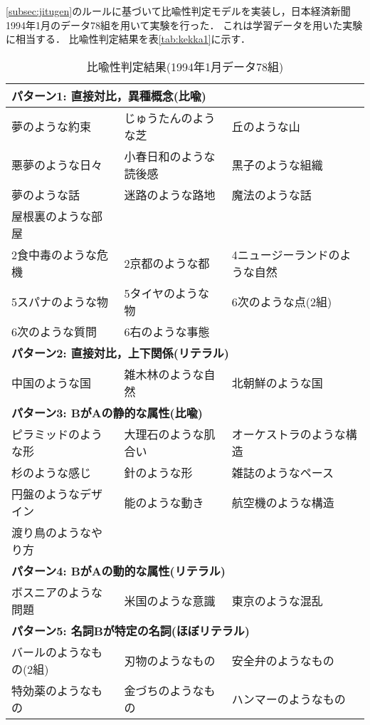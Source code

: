 \ref{subsec:jitugen}のルールに基づいて比喩性判定モデルを実装し，日本経済新聞1994年1月のデータ78組を用いて実験を行った．
これは学習データを用いた実験に相当する．
比喩性判定結果を表\ref{tab:kekka1}に示す．

\begin{table}[htbp]
	\caption{比喩性判定結果(1994年1月データ78組)}
	\begin{center}
	\begin{small}
	\begin{tabular}{|lll|}
		\hline
		\multicolumn{3}{|l|}{{\bf パターン1: 直接対比，異種概念(比喩)}} \\
		\hline
		夢のような約束 & じゅうたんのような芝 & 丘のような山 \\
		悪夢のような日々 & 小春日和のような読後感 & 黒子のような組織 \\
		夢のような話 & 迷路のような路地 & 魔法のような話 \\
		屋根裏のような部屋 & & \\
		\hline
		2食中毒のような危機 & 2京都のような都 & 4ニュージーランドのような自然 \\
		5スパナのような物 & 5タイヤのような物 & 6次のような点(2組) \\
		6次のような質問 & 6右のような事態 & \\
		\hline
		\hline
		\multicolumn{3}{|l|}{{\bf パターン2: 直接対比，上下関係(リテラル)}} \\
		\hline
		中国のような国 & 雑木林のような自然 & 北朝鮮のような国 \\
		\hline
		\hline
		\multicolumn{3}{|l|}{{\bf パターン3: BがAの静的な属性(比喩)}} \\
		\hline
		ピラミッドのような形 & 大理石のような肌合い & オーケストラのような構造 \\
		杉のような感じ & 針のような形 & 雑誌のようなペース \\
		円盤のようなデザイン & 能のような動き & 航空機のような構造 \\
		渡り鳥のようなやり方 & & \\
		\hline
		\hline
		\multicolumn{3}{|l|}{{\bf パターン4: BがAの動的な属性(リテラル)}} \\
		\hline
		ボスニアのような問題 & 米国のような意識 & 東京のような混乱 \\
		\hline
		\hline
		\multicolumn{3}{|l|}{{\bf パターン5: 名詞Bが特定の名詞(ほぼリテラル)}} \\
		\hline
		バールのようなもの(2組) & 刃物のようなもの & 安全弁のようなもの \\
		特効薬のようなもの & 金づちのようなもの & ハンマーのようなもの \\

\end{tabular}
\end{small}
\end{center}
\end{table}
